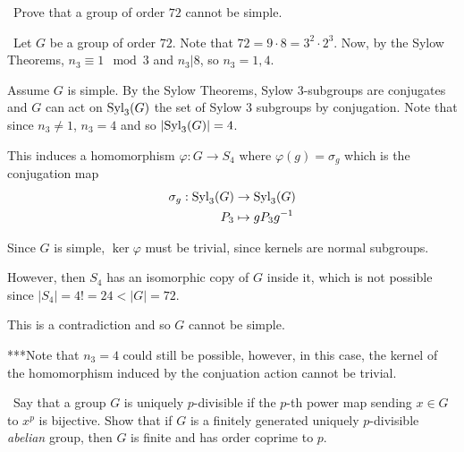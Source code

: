 \documentclass[12pt]{Qual}
\begin{document}
\begin{problem} $\,$
Prove that a group of order $72$ cannot be simple.
\end{problem}


\begin{solution}$\,$
Let $G$ be a group of order $72$. Note that $72=9\cdot8=3^2\cdot 2^3$. Now, by the Sylow Theorems, $n_3\equiv 1\mod 3$ and $n_3|8$, so $n_3=1,4$.

Assume $G$ is simple. By the Sylow Theorems, Sylow $3$-subgroups are conjugates and $G$ can act on $\text{Syl}_3(G)$ the set of Sylow $3$ subgroups by conjugation. Note that since $n_3\not=1$, $n_3=4$ and so $|\text{Syl}_3(G)|=4$.

This induces a homomorphism $\varphi:G\to S_4$ where $\varphi(g)=\sigma_g$ which is the conjugation map \begin{align*}
    \sigma_g:\text{Syl}_3(G)&\to\text{Syl}_3(G)\\
    P_3&\mapsto gP_3g^{-1}
\end{align*}

Since $G$ is simple, $\ker\varphi$ must be trivial, since kernels are normal subgroups.

However, then $S_4$ has an isomorphic copy of $G$ inside it, which is not possible since $|S_4|=4!=24<|G|=72$.

This is a contradiction and so $G$ cannot be simple.

***Note that $n_3=4$ could still be possible, however, in this case, the kernel of the homomorphism induced by the conjuation action cannot be trivial.
\end{solution}
\newpage


\begin{problem} $\,$
Say that a group $G$ is uniquely $p$-divisible if the $p$-th power map sending $x\in G$ to $x^p$ is bijective. Show that if $G$ is a finitely generated uniquely $p$-divisible \textit{abelian} group, then $G$ is finite and has order coprime to $p.$
\end{problem}
\end{document}

